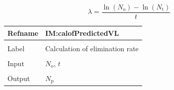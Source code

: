 \documentclass[12pt]{article}
\begin{document}
\begin{displaymath}
λ=\frac{\ln\left({N_{\text{o}}}\right)-\ln\left({N_{\text{t}}}\right)}{t}
\end{displaymath}
\vspace{\baselineskip}
\noindent
\begin{minipage}{\textwidth}
\begin{tabular}{>{\raggedright}p{}>{\raggedright\arraybackslash}p{}}
\toprule \textbf{Refname} & \textbf{IM:calofPredictedVL}
\label{IM:calofPredictedVL}
\\ \midrule \\
Label & Calculation of elimination rate
        
\\ \midrule \\
Input & ${N_{\text{o}}}$, $t$
        
\\ \midrule \\
Output & ${N_{\text{p}}}$
         

\end{tabular}
\end{minipage}
\end{document}
